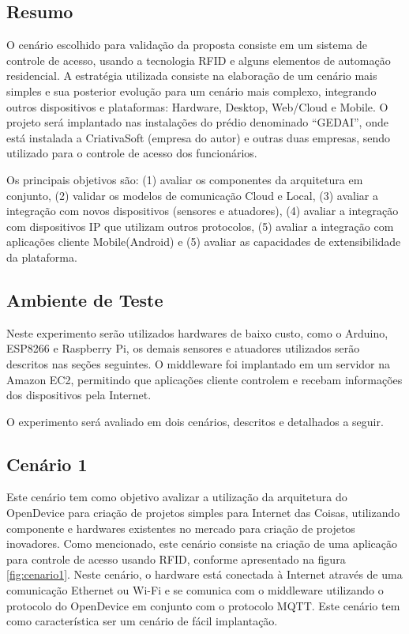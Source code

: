 \subsection{Resumo}

O cenário escolhido para validação da proposta consiste em um sistema
de controle de acesso, usando a tecnologia RFID e alguns elementos
de automação residencial. A estratégia utilizada consiste na elaboração
de um cenário mais simples e sua posterior evolução para um cenário
mais complexo, integrando outros dispositivos e plataformas: Hardware,
Desktop, Web/Cloud e Mobile. O projeto será implantado nas instalações
do prédio denominado ``GEDAI'', onde está instalada a CriativaSoft
(empresa do autor) e outras duas empresas, sendo utilizado para o
controle de acesso dos funcionários. 

Os principais objetivos são: (1) avaliar os componentes da arquitetura
em conjunto, (2) validar os modelos de comunicação Cloud e Local,
(3) avaliar a integração com novos dispositivos (sensores e atuadores),
(4) avaliar a integração com dispositivos IP que utilizam outros protocolos,
(5) avaliar a integração com aplicações cliente Mobile(Android) e
(5) avaliar as capacidades de extensibilidade da plataforma.

\subsection{Ambiente de Teste}

Neste experimento serão utilizados hardwares de baixo custo, como
o Arduino, ESP8266 e Raspberry Pi, os demais sensores e atuadores
utilizados serão descritos nas seções seguintes. O middleware foi
implantado em um servidor na Amazon EC2, permitindo que aplicações
cliente controlem e recebam informações dos dispositivos pela Internet.

O experimento será avaliado em dois cenários, descritos e detalhados
a seguir.


\subsection{Cenário 1}

Este cenário tem como objetivo avalizar a utilização da arquitetura
do OpenDevice para criação de projetos simples para Internet das Coisas,
utilizando componente e hardwares existentes no mercado para criação
de projetos inovadores. Como mencionado, este cenário consiste na
criação de uma aplicação para controle de acesso usando RFID, conforme
apresentado na figura \ref{fig:cenario1}. Neste cenário, o hardware
está conectada à Internet através de uma comunicação Ethernet ou Wi-Fi
e se comunica com o middleware utilizando o protocolo do OpenDevice
em conjunto com o protocolo MQTT. Este cenário tem como característica
ser um cenário de fácil implantação. 

